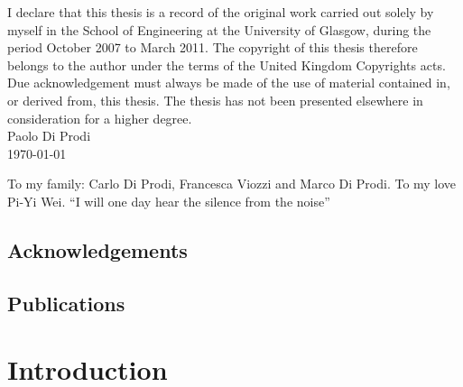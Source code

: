 \documentclass{book}
\begin{document}
\newpage
\begin{minipage}[center]{0.8\textwidth}
I declare that this thesis is a record of the original work carried out solely
by myself in the School of Engineering at the 
University of Glasgow, during the period October 2007 to March 2011.
The copyright of this thesis therefore belongs to the author under the terms
of the United Kingdom Copyrights acts. Due acknowledgement must always be made
of the use of material contained in, or derived from, this thesis.
The thesis has not been presented elsewhere in consideration for a higher
degree.\\
\linebreak[4]
Paolo Di Prodi\\
\linebreak[2]
\today
\end{minipage}

\newpage
\begin{minipage}[center]{1.0\textwidth}
\begin{large}
\begin{center}
To my family: Carlo Di Prodi, Francesca Viozzi 
\linebreak[1]
and Marco Di Prodi.
\linebreak[4]
To my love Pi-Yi Wei.
\linebreak[4]
``I will one day hear the silence from the noise''\end{center}
\end{large}

\end{minipage}

\newpage
\tableofcontents
\listoftables
\listoffigures
\printnomenclature[1cm]
\newpage
\section*{Acknowledgements}


\newpage

\section*{Publications}


\chapter{Introduction \label{Chapter:Intro}}
\end{document}
